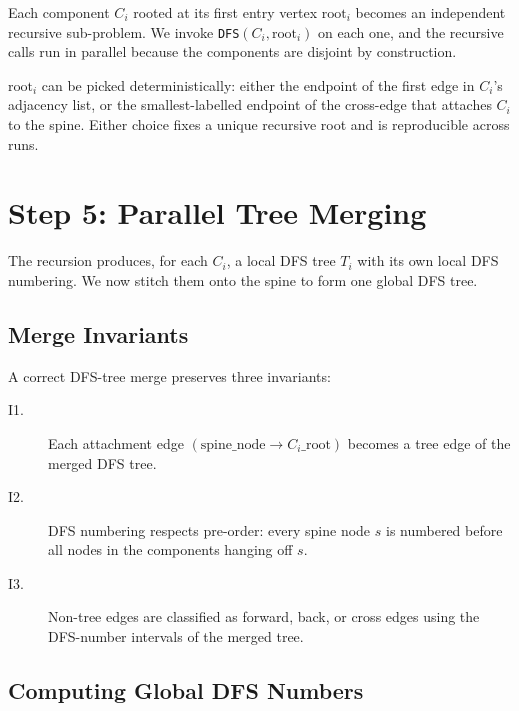 Each component $C_i$ rooted at its first entry vertex $\mathrm{root}_i$
becomes an independent recursive sub-problem.  We invoke
\texttt{DFS$(C_i, \mathrm{root}_i)$} on each one, and the recursive
calls run in parallel because the components are disjoint by
construction.

\begin{ppnote}
$\mathrm{root}_i$ can be picked deterministically: either the endpoint
of the first edge in $C_i$'s adjacency list, or the smallest-labelled
endpoint of the cross-edge that attaches $C_i$ to the spine.
Either choice fixes a unique recursive root and is reproducible across
runs.
\end{ppnote}

\section{Step 5: Parallel Tree Merging}
\label{sec:dfs-merge}

The recursion produces, for each $C_i$, a local DFS tree $T_i$ with its
own local DFS numbering.  We now stitch them onto the spine to form one
global DFS tree.

\subsection{Merge Invariants}

\begin{ppdefn}
A correct DFS-tree merge preserves three invariants:
\begin{description}
  \item[I1.] Each attachment edge
        $(\text{spine\_node} \to C_i\text{\_root})$ becomes a tree
        edge of the merged DFS tree.
  \item[I2.] DFS numbering respects pre-order: every spine node $s$
        is numbered before all nodes in the components hanging off
        $s$.
  \item[I3.] Non-tree edges are classified as forward, back, or cross
        edges using the DFS-number intervals of the merged tree.
\end{description}
\end{ppdefn}

\subsection{Computing Global DFS Numbers}

